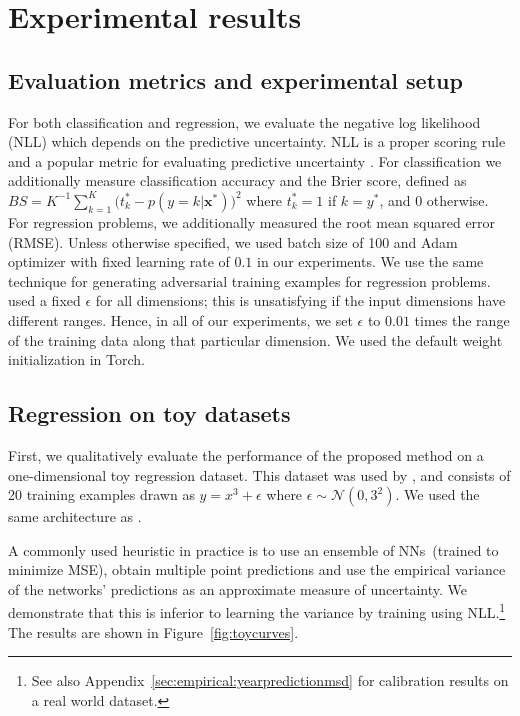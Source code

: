 \documentclass{article}
\newcommand{\bx}{\mathbf{x}}
\newcommand{\N}{\mathcal{N}}
\newcommand{\nn}{NNs}
\begin{document}
\section{Experimental results}
\subsection{Evaluation metrics and experimental setup}
 
For both classification and regression, we evaluate the negative log likelihood (NLL) which depends on the predictive uncertainty. NLL is a proper scoring rule and a popular metric for evaluating predictive uncertainty \citep{quinonero2006evaluating}. For classification we additionally measure classification accuracy  and the Brier score, defined as 
$BS={K}^{-1}\sum_{k=1}^K \bigl(t^*_{k}-p(y=k|\bx^*)\bigr)^2$
where %
$t^*_k=1$  if  $k=y^*$, and  $0$ otherwise. 
For regression problems, we additionally measured the root mean squared error (RMSE). 
Unless otherwise specified, we used batch size of 100 and Adam optimizer with fixed learning rate of $0.1$ in our experiments. 
We use the same technique for generating adversarial training examples for regression problems. \citet{adversarial} used a fixed $\epsilon$ for all dimensions; this is unsatisfying if the input dimensions have different ranges. Hence, in all of our experiments, we set $\epsilon$ to $0.01$ times the range of the training data along that particular dimension. %
We used the default weight initialization in Torch. 
 


\subsection{Regression on toy datasets}
First, we qualitatively evaluate the performance of the proposed method on a one-dimensional toy regression dataset. This dataset was used by \citet{PB}, and consists of 20 training examples drawn as $y=x^3+\epsilon$ where $\epsilon\sim\N(0,3^2)$. We used the same architecture as \citep{PB}. 

A commonly used heuristic in practice is to use an ensemble of \nn~(trained to minimize MSE), obtain multiple point predictions and use the empirical variance of the networks' predictions as an approximate measure of uncertainty. We demonstrate that this is inferior to learning the variance by training using NLL.\footnote{See also Appendix~\ref{sec:empirical:yearpredictionmsd} for calibration results on a real world dataset.} The results are shown in Figure~\ref{fig:toycurves}. 
\end{document}

